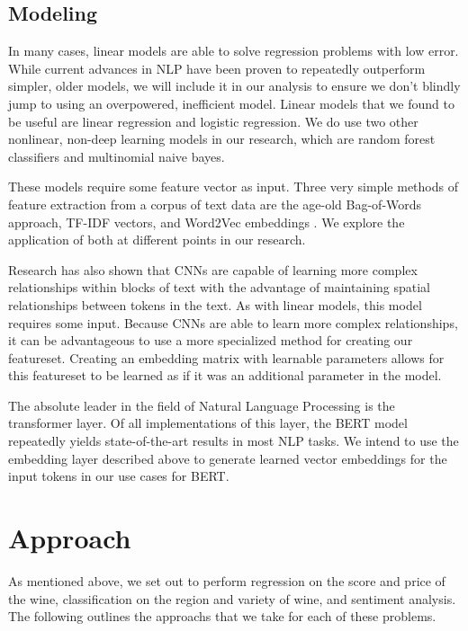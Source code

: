 \documentclass[12pt]{IEEEtran}
\begin{document}
\subsection{Modeling}
    In many cases, linear models are able to solve regression problems with low error. While current advances in NLP have been proven to repeatedly outperform simpler, older models, we will include it in our analysis to ensure we don't blindly jump to using an overpowered, inefficient model. Linear models that we found to be useful are linear regression and logistic regression. We do use two other nonlinear, non-deep learning models in our research, which are random forest classifiers and multinomial naive bayes. \par
    These models require some feature vector as input. Three very simple methods of feature extraction from a corpus of text data are the age-old Bag-of-Words approach\cite{bag_of_words}, TF-IDF vectors, and Word2Vec embeddings \cite{word2vec}. We explore the application of both at different points in our research.\par
    Research has also shown that CNNs are capable of learning more complex relationships within blocks of text with the advantage of maintaining spatial relationships between tokens in the text\cite{cnn}. As with linear models, this model requires some input. Because CNNs are able to learn more complex relationships, it can be advantageous to use a more specialized method for creating our featureset. Creating an embedding matrix with learnable parameters allows for this featureset to be learned as if it was an additional parameter in the model.\par
    The absolute leader in the field of Natural Language Processing is the transformer layer. Of all implementations of this layer, the BERT model repeatedly yields state-of-the-art results in most NLP tasks\cite{bert}. We intend to use the embedding layer described above to generate learned vector embeddings for the input tokens in our use cases for BERT.

\section{Approach}
    As mentioned above, we set out to perform regression on the score and price of the wine, classification on the region and variety of wine, and sentiment analysis. The following outlines the approachs that we take for each of these problems.
\end{document}
